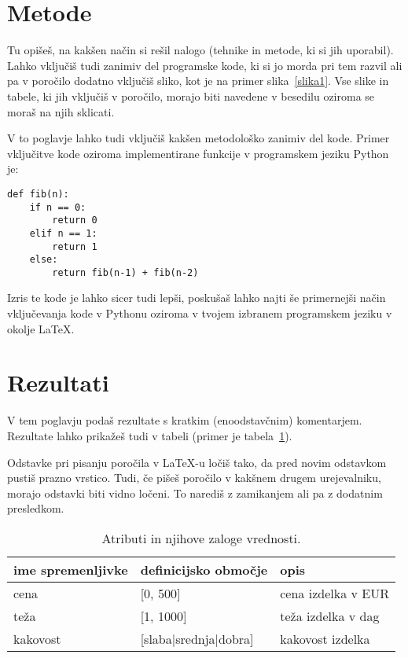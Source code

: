 \documentclass[a4paper,11pt]{article}
\begin{document}
\section{Metode}

Tu opišeš, na kakšen način si rešil nalogo (tehnike in metode, ki si
jih uporabil). Lahko vključiš tudi zanimiv del programske kode, ki
si jo morda pri tem razvil ali pa v poročilo dodatno vključiš sliko,
kot je na primer slika~\ref{slika1}. Vse slike in tabele, ki jih
vključiš v poročilo, morajo biti navedene v besedilu oziroma se moraš
na njih sklicati.


V to poglavje lahko tudi vključiš kakšen metodološko zanimiv del
kode. Primer vključitve kode oziroma implementirane funkcije v
programskem jeziku Python je:

\begin{lstlisting}
def fib(n):
    if n == 0:
        return 0
    elif n == 1:
        return 1
    else:
        return fib(n-1) + fib(n-2)
\end{lstlisting}

Izris te kode je lahko sicer tudi lepši, poskušaš lahko najti še
primernejši način vključevanja kode v Pythonu oziroma v tvojem izbranem
programskem jeziku v okolje \LaTeX{}.

\section{Rezultati}

V tem poglavju podaš rezultate s kratkim (enoodstavčnim)
komentarjem. Rezultate lahko prikažeš tudi v tabeli (primer je
tabela~\ref{tab1}).

Odstavke pri pisanju poročila v LaTeX-u ločiš tako, da pred novim
odstavkom pustiš prazno vrstico. Tudi, če pišeš poročilo v kakšnem
drugem urejevalniku, morajo odstavki biti vidno ločeni. To narediš z
zamikanjem ali pa z dodatnim presledkom.

\begin{table}[htbp]
\caption{Atributi in njihove zaloge vrednosti.}
\label{tab1}
\begin{center}
\begin{tabular}{llp{3cm}}
\hline
ime spremenljivke & definicijsko območje & opis \\
\hline
cena & [0, 500] & cena izdelka v EUR\\
teža & [1, 1000] & teža izdelka v dag \\
kakovost & [slaba|srednja|dobra] & kakovost izdelka \\
\hline
\end{tabular}
\end{center}
\end{table}
\end{document}
